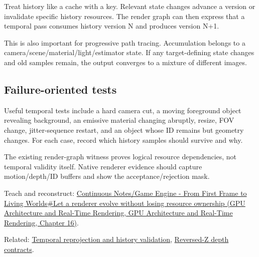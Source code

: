 Treat history like a cache with a key. Relevant state changes advance a version or invalidate specific history resources. The render graph can then express that a temporal pass consumes history version N and produces version N+1.

This is also important for progressive path tracing. Accumulation belongs to a camera/scene/material/light/estimator state. If any target-defining state changes and old samples remain, the output converges to a mixture of different images.

\subsection{Failure-oriented tests}\label{appendix-2e7e9fd28a2c-failure-oriented-tests}

Useful temporal tests include a hard camera cut, a moving foreground object revealing background, an emissive material changing abruptly, resize, FOV change, jitter-sequence restart, and an object whose ID remains but geometry changes. For each case, record which history samples should survive and why.

The existing render-graph witness proves logical resource dependencies, not temporal validity itself. Native renderer evidence should capture motion/depth/ID buffers and show the acceptance/rejection mask.

Teach and reconstruct: \href{../06-GPU-Architecture-and-Real-Time-Rendering/main.pdf\#nameddest=06-engine-ii-ch025-let-a-renderer-evolve-without-losing-resource-ownership}{Continuous Notes/Game Engine - From First Frame to Living Worlds\#Let a renderer evolve without losing resource ownership (GPU Architecture and Real-Time Rendering, GPU Architecture and Real-Time Rendering, Chapter 16)}.

Related: \hyperref[appendix-0727340a4428]{Temporal reprojection and history validation}, \hyperref[appendix-275ec8847057]{Reversed-Z depth contracts}.
